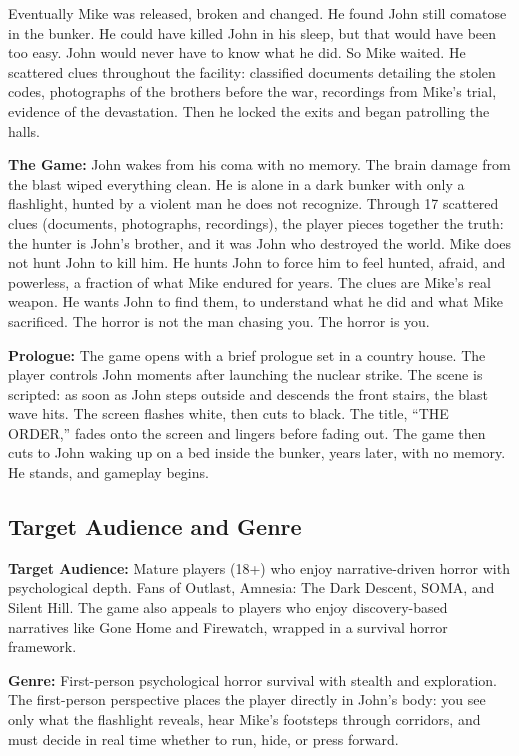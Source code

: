 \documentclass[12pt, letterpaper]{article}
\begin{document}
Eventually Mike was released, broken and changed. He found John still comatose in the bunker. He could have killed John in his sleep, but that would have been too easy. John would never have to know what he did. So Mike waited. He scattered clues throughout the facility: classified documents detailing the stolen codes, photographs of the brothers before the war, recordings from Mike's trial, evidence of the devastation. Then he locked the exits and began patrolling the halls.

\textbf{The Game:} John wakes from his coma with no memory. The brain damage from the blast wiped everything clean. He is alone in a dark bunker with only a flashlight, hunted by a violent man he does not recognize. Through 17 scattered clues (documents, photographs, recordings), the player pieces together the truth: the hunter is John's brother, and it was John who destroyed the world. Mike does not hunt John to kill him. He hunts John to force him to feel hunted, afraid, and powerless, a fraction of what Mike endured for years. The clues are Mike's real weapon. He wants John to find them, to understand what he did and what Mike sacrificed. The horror is not the man chasing you. The horror is you.

\textbf{Prologue:} The game opens with a brief prologue set in a country house. The player controls John moments after launching the nuclear strike. The scene is scripted: as soon as John steps outside and descends the front stairs, the blast wave hits. The screen flashes white, then cuts to black. The title, ``THE ORDER,'' fades onto the screen and lingers before fading out. The game then cuts to John waking up on a bed inside the bunker, years later, with no memory. He stands, and gameplay begins.

\subsection{Target Audience and Genre}

\textbf{Target Audience:} Mature players (18+) who enjoy narrative-driven horror with psychological depth. Fans of Outlast, Amnesia: The Dark Descent, SOMA, and Silent Hill. The game also appeals to players who enjoy discovery-based narratives like Gone Home and Firewatch, wrapped in a survival horror framework.

\textbf{Genre:} First-person psychological horror survival with stealth and exploration. The first-person perspective places the player directly in John's body: you see only what the flashlight reveals, hear Mike's footsteps through corridors, and must decide in real time whether to run, hide, or press forward.
\end{document}
